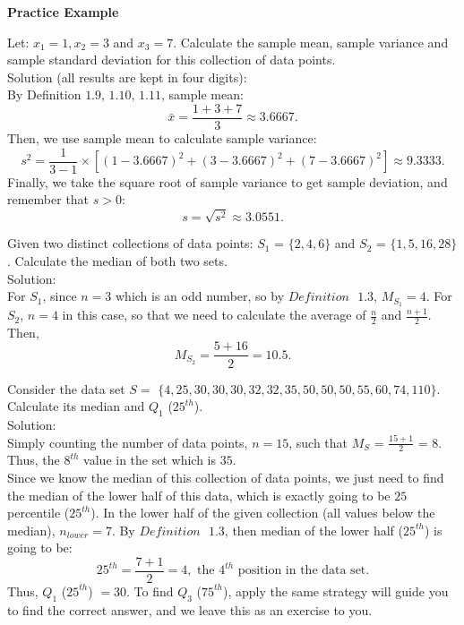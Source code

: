 \textbf{Practice Example}

\begin{example}
Let: $x_1 = 1, x_2 = 3$ and $x_3 = 7$. Calculate the sample mean, sample variance and sample standard deviation for this collection of data points.\\
Solution (all results are kept in four digits):\\
By Definition $1.9 \text{, } 1.10 \text{, } 1.11$, sample mean: \[ \bar{x} = \frac{1+3+7}{3} \approx 3.6667.\]
Then, we use sample mean to calculate sample variance: \[ s^2 = \frac{1}{3-1} \times [(1-3.6667)^2+(3-3.6667)^2+(7-3.6667)^2] \approx 9.3333.\]
Finally, we take the square root of sample variance to get sample deviation, and remember that $s > 0$: \[ s = \sqrt{s^2} \approx 3.0551.\]
\end{example}

\begin{example}
Given two distinct collections of data points: $S_1$ = $\{2, 4, 6\}$ and $S_2$ = $\{1, 5, 16, 28\}$. Calculate the median of both two sets.\\
Solution: \\
For $S_1$, since $n = 3$ which is an odd number, so by $Definition \text{ } 1.3$, $M_{S_1} = 4$. For $S_2$, $n = 4$ in this case, so that we need to calculate the average of $\frac{n}{2}$ and $\frac{n+1}{2}$. Then, \[ M_{S_2} = \frac{5+16}{2} = 10.5.\]
\end{example}

\begin{example}
Consider the data set $S = $ $\{4, 25, 30, 30, 30, 32, 32, 35, 50, 50, 50, 55, 60, 74, 110\}$. Calculate its median and $Q_1$ ($25^{th}$).\\
Solution:\\
Simply counting the number of data points, $n = 15$, such that $M_{S}$ = $\frac{15 + 1}{2}$ = $8$. Thus, the $8^{th}$ value in the set which is $35$.\\
Since we know the median of this collection of data points, we just need to find the median of the lower half of this data, which is exactly going to be $25$ percentile ($25^{th}$). In the lower half of the given collection (all values below the median), $n_{lower} = 7$. By $Definition \text{ } 1.3$, then median of the lower half ($25^{th}$) is going to be: \[ 25^{th} = \frac{7+1}{2} = 4, \text{ the $4^{th}$ position in the data set}.\] Thus, $Q_1$ ($25^{th}$) $= 30$. To find $Q_3$ ($75^{th}$), apply the same strategy will guide you to find the correct answer, and we leave this as an exercise to you.
\end{example}

